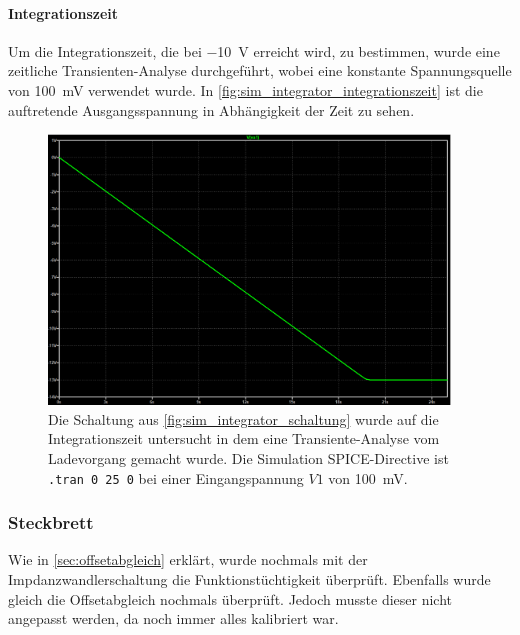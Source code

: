 \documentclass[12pt,english,ngerman]{scrartcl}
\begin{document}
\paragraph{Integrationszeit}
Um die Integrationszeit, die bei \SI{-10}{\volt} erreicht wird, zu bestimmen, wurde eine zeitliche 
Transienten-Analyse durchgeführt, wobei eine konstante Spannungsquelle von \SI{100}{\milli\volt} verwendet
wurde. In \autoref{fig:sim_integrator_integrationszeit} ist die auftretende Ausgangsspannung in
Abhängigkeit der Zeit zu sehen.


\begin{figure}[H]
  \centering
    \includegraphics[width=0.95\textwidth]{./figures/integrator/sim/umkehr_int/dauer_aussteu.png}
  \caption{Die Schaltung aus \autoref{fig:sim_integrator_schaltung} wurde auf
  die Integrationszeit untersucht in dem eine Transiente-Analyse vom
  Ladevorgang gemacht wurde. Die Simulation SPICE-Directive ist \texttt{.tran 0 25 0} 
  bei einer Eingangspannung $V1$ von \SI{100}{\milli\volt}.}
  \label{fig:sim_integrator_integrationszeit}
\end{figure}

\subsubsection{Steckbrett}
Wie in \autoref{sec:offsetabgleich} erklärt, wurde nochmals mit der
Impdanzwandlerschaltung die Funktionstüchtigkeit überprüft. Ebenfalls wurde
gleich die Offsetabgleich nochmals überprüft. Jedoch musste dieser nicht
angepasst werden, da noch immer alles kalibriert war.
\end{document}
